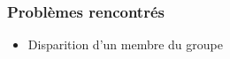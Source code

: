 
\begin{frame}
	\frametitle{Problèmes rencontrés}
	\begin{itemize}
		\item Disparition d'un membre du groupe
	\end{itemize}
\end{frame}


